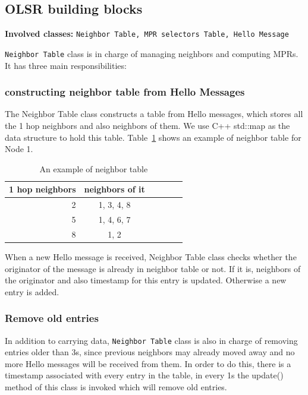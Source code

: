 \documentclass[twocolumn]{article}
\begin{document}
    \subsection{OLSR building blocks}
{\bf Involved classes: } {\tt Neighbor Table, MPR selectors Table, Hello Message}
\par{{\tt Neighbor Table} class is in charge of managing neighbors and computing MPRs. It has three main responsibilities:}
\subsubsection{constructing neighbor table from Hello Messages}
\par{The Neighbor Table class constructs a table from Hello messages, which stores all the 1 hop neighbors and also neighbors of them. We use C++ std::map as the data structure to hold this table. Table~\ref{tab:data} shows an example of neighbor table for Node 1.}
\begin{table}[htb]
\begin{center}
\begin{tabular}{|r|c|r|c|r|c|}
\hline  
{\bf 1 hop neighbors}      & {\bf neighbors of it}     \\ \hline
2    &                     1, 3, 4, 8        \\ \hline
5    &                     1, 4, 6, 7          \\ \hline
8    &                     1, 2     \\ \hline
\end{tabular}
\caption{An example of neighbor table}
\label{tab:data}
\end{center}
\end{table}
\par{When a new Hello message is received, Neighbor Table class checks whether the originator of the message is already in neighbor table or not. If it is, neighbors of the originator and also timestamp for this entry is updated. Otherwise a new entry is added.}
\subsubsection{Remove old entries}
\par{In addition to carrying data, {\tt Neighbor Table} class is also in charge of removing entries older than 3s, since previous neighbors may already moved away and no more Hello messages will be received from them. In order to do this, there is a timestamp associated with every entry in the table, in every 1s the update() method of this class is invoked which will remove old entries.}
\end{document}
